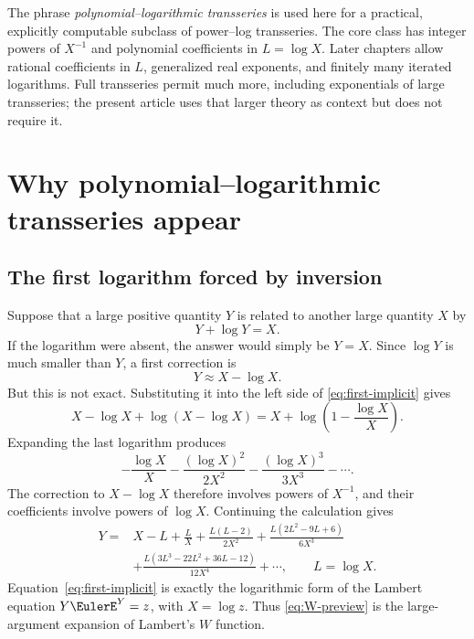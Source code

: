 \documentclass[11pt,openany]{book}
\theoremstyle{definition}
\theoremstyle{plain}
\theoremstyle{remark}
\begin{document}
\begin{scopebox}
The phrase \emph{polynomial--logarithmic transseries} is used here for a
practical, explicitly computable subclass of power--log transseries.  The core
class has integer powers of \(X^{-1}\) and polynomial coefficients in
\(L=\log X\).  Later chapters allow rational coefficients in \(L\), generalized
real exponents, and finitely many iterated logarithms.  Full transseries permit
much more, including exponentials of large transseries; the present article
uses that larger theory as context but does not require it.
\end{scopebox}

\tableofcontents

\mainmatter

\chapter{Why polynomial--logarithmic transseries appear}\label{ch:motivation}

\section{The first logarithm forced by inversion}
Suppose that a large positive quantity \(Y\) is related to another large
quantity \(X\) by
\begin{equation}\label{eq:first-implicit}
  Y+\log Y=X.
\end{equation}
If the logarithm were absent, the answer would simply be \(Y=X\).  Since
\(\log Y\) is much smaller than \(Y\), a first correction is
\[
  Y\approx X-\log X.
\]
But this is not exact.  Substituting it into the left side of
\cref{eq:first-implicit} gives
\[
 X-\log X+\log(X-\log X)
 =X+\log\!\left(1-\frac{\log X}{X}\right).
\]
Expanding the last logarithm produces
\[
 -\frac{\log X}{X}
 -\frac{(\log X)^2}{2X^2}
 -\frac{(\log X)^3}{3X^3}-\cdots.
\]
The correction to \(X-\log X\) therefore involves powers of \(X^{-1}\), and
their coefficients involve powers of \(\log X\).  Continuing the calculation
gives
\begin{equation}\label{eq:W-preview}
\begin{split}
Y={}&X-L+\frac{L}{X}
 +\frac{L(L-2)}{2X^2}
 +\frac{L(2L^2-9L+6)}{6X^3}\\
&+\frac{L(3L^3-22L^2+36L-12)}{12X^4}+\cdots,
\qquad L=\log X.
\end{split}
\end{equation}
Equation~\eqref{eq:first-implicit} is exactly the logarithmic form of the
Lambert equation \(Y\EulerE^Y=z\), with \(X=\log z\).  Thus
\cref{eq:W-preview} is the large-argument expansion of Lambert's \(W\)
function.
\end{document}
